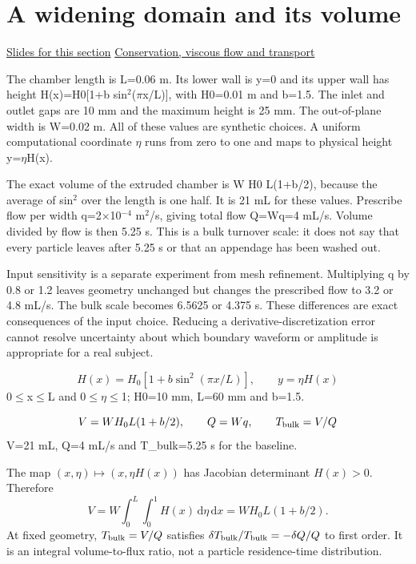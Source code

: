 \documentclass[11pt,letterpaper]{article}
\theoremstyle{definition}\newtheorem{definition}{Definition}\newtheorem{example}{Example}
\numberwithin{equation}{section}
\begin{document}
\section{A widening domain and its volume}
\hypertarget{note-a-widening-domain-and-its-volume}{}\label{note:a-widening-domain-and-its-volume}
{\small \href{slides.html\#frame=the-mapped-chamber\&step=1}{Slides for this section} \quad \href{../modules/cfd/index.html}{Conservation, viscous flow and transport}}\par
The chamber length is L=0.06 m. Its lower wall is y=0 and its upper wall has height H(x)=H0[1+b sin\ensuremath{^{2}}(\ensuremath{\pi}x/L)], with H0=0.01 m and b=1.5. The inlet and outlet gaps are 10 mm and the maximum height is 25 mm. The out-of-plane width is W=0.02 m. All of these values are synthetic choices. A uniform computational coordinate \ensuremath{\eta} runs from zero to one and maps to physical height y=\ensuremath{\eta}H(x).

The exact volume of the extruded chamber is W H0 L(1+b/2), because the average of sin\ensuremath{^{2}} over the length is one half. It is 21 mL for these values. Prescribe flow per width q=2\ensuremath{\times}10\ensuremath{^{-4}} m\ensuremath{^{2}}/s, giving total flow Q=Wq=4 mL/s. Volume divided by flow is then 5.25 s. This is a bulk turnover scale: it does not say that every particle leaves after 5.25 s or that an appendage has been washed out.

Input sensitivity is a separate experiment from mesh refinement. Multiplying q by 0.8 or 1.2 leaves geometry unchanged but changes the prescribed flow to 3.2 or 4.8 mL/s. The bulk scale becomes 6.5625 or 4.375 s. These differences are exact consequences of the input choice. Reducing a derivative-discretization error cannot resolve uncertainty about which boundary waveform or amplitude is appropriate for a real subject.

\[
H(x)=H_0[1+b\sin^2(\pi x/L)],\qquad y=\eta H(x)
\]
0\ensuremath{\le}x\ensuremath{\le}L and 0\ensuremath{\le}\ensuremath{\eta}\ensuremath{\le}1; H0=10 mm, L=60 mm and b=1.5.

\[
V=WH_0L(1+b/2),\qquad Q=Wq,\qquad T_{\rm bulk}=V/Q
\]
V=21 mL, Q=4 mL/s and T\_bulk=5.25 s for the baseline.

The map $(x,\eta)\mapsto(x,\eta H(x))$ has Jacobian determinant $H(x)>0$. Therefore
\[
 V=W\int_0^L\int_0^1H(x)\,\mathrm d\eta\,\mathrm dx
   =WH_0L(1+b/2).
\]
At fixed geometry, $T_{\rm bulk}=V/Q$ satisfies $\delta T_{\rm bulk}/T_{\rm bulk}=-\delta Q/Q$ to first order. It is an integral volume-to-flux ratio, not a particle residence-time distribution.
\end{document}
